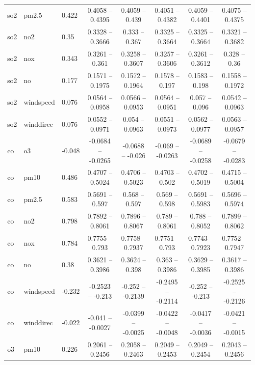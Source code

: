 \documentclass{beamer}
\begin{document}
\begin{frame}
{\begin{tabular}{lllccccc}
      so2       & pm2.5     & 0.422  & 0.4058  -- 0.4395  & 0.4059  -- 0.439   & 0.4051  -- 0.4382  & 0.4059  -- 0.4401  & 0.4075  -- 0.4375 \\
      so2       & no2       & 0.35   & 0.3328  -- 0.3666  & 0.333   -- 0.367   & 0.3325  -- 0.3664  & 0.3325  -- 0.3664  & 0.3321  -- 0.3682 \\
      so2       & nox       & 0.343  & 0.3261  -- 0.361   & 0.3258  -- 0.3607  & 0.3257  -- 0.3606  & 0.3261  -- 0.3612  & 0.328   -- 0.36   \\
      so2       & no        & 0.177  & 0.1571  -- 0.1975  & 0.1572  -- 0.1964  & 0.1578  -- 0.197   & 0.1583  -- 0.198   & 0.1558  -- 0.1972 \\
      so2       & windspeed & 0.076  & 0.0564  -- 0.0958  & 0.0566  -- 0.0953  & 0.0564  -- 0.0951  & 0.057   -- 0.096   & 0.0542  -- 0.0963 \\
      so2       & winddirec & 0.076  & 0.0552  -- 0.0971  & 0.054   -- 0.0963  & 0.0551  -- 0.0973  & 0.0562  -- 0.0977  & 0.0563  -- 0.0957 \\
      co        & o3        & -0.048 & -0.0684 -- -0.0265 & -0.0688 -- -0.026  & -0.069  -- -0.0263 & -0.0689 -- -0.0258 & -0.0679 -- -0.0283 \\
      co        & pm10      & 0.486  & 0.4707  -- 0.5024  & 0.4706  -- 0.5023  & 0.4703  -- 0.502   & 0.4702  -- 0.5019  & 0.4715  -- 0.5004 \\
      co        & pm2.5     & 0.583  & 0.5691  -- 0.597   & 0.568   -- 0.597   & 0.569   -- 0.598   & 0.5691  -- 0.5983  & 0.5696  -- 0.5974 \\
      co        & no2       & 0.798  & 0.7892  -- 0.8061  & 0.7896  -- 0.8067  & 0.789   -- 0.8061  & 0.788   -- 0.8052  & 0.7899  -- 0.8062 \\
      co        & nox       & 0.784  & 0.7755  -- 0.793   & 0.7758  -- 0.7937  & 0.7751  -- 0.793   & 0.7743  -- 0.7923  & 0.7752  -- 0.7947 \\
      co        & no        & 0.38   & 0.3621  -- 0.3986  & 0.3624  -- 0.398   & 0.363   -- 0.3986  & 0.3629  -- 0.3985  & 0.3617  -- 0.3986  \\
      co        & windspeed & -0.232 & -0.2523 -- -0.213  & -0.252  -- -0.2139 & -0.2495 -- -0.2114 & -0.252  -- -0.213  & -0.2525 -- -0.2126 \\
      co        & winddirec & -0.022 & -0.041  -- -0.0027 & -0.0399 -- -0.0025 & -0.0422 -- -0.0048 & -0.0417 -- -0.0036 & -0.0421 -- -0.0015 \\
      o3        & pm10      & 0.226  & 0.2061  -- 0.2456  & 0.2058  -- 0.2463  & 0.2049  -- 0.2453  & 0.2049  -- 0.2454  & 0.2043  -- 0.2456 \\

\end{tabular}}
\end{frame}
\end{document}
